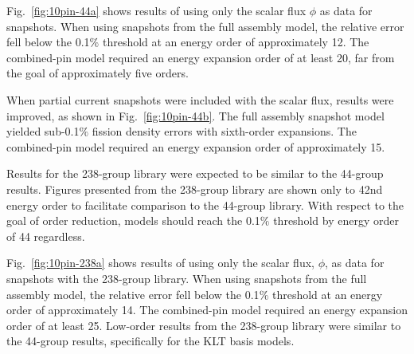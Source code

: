\documentclass[5p,times,twocolumn,10pt]{elsarticle}
\begin{document}
    Fig.~\ref{fig:10pin-44a} shows results of using only the scalar flux $\phi$
    as data for snapshots.  When using snapshots from the full assembly model,
    the relative error fell below the 0.1$\%$ threshold at an energy order of
    approximately 12.  The combined-pin model required an energy expansion
order
    of at least 20, far from the goal of approximately five orders.

    When partial current snapshots were included with the scalar flux, results
    were
    improved, as shown in Fig.~\ref{fig:10pin-44b}. The full assembly snapshot
    model yielded sub-0.1$\%$ fission density errors with sixth-order
    expansions.  The combined-pin model required an energy expansion order of
    approximately 15.

    Results for the 238-group library were expected to be similar to the
    44-group results.  Figures presented from the 238-group library
    are shown only to 42nd energy order to facilitate comparison to the
44-group
    library.  With respect to the goal of order reduction, models should
    reach the 0.1$\%$ threshold by energy order of 44 regardless.

    Fig.~\ref{fig:10pin-238a} shows results of using only the scalar flux,
    $\phi$, as data for snapshots with the 238-group library.  When using
snapshots
    from the full assembly model, the relative error fell below the 0.1$\%$
    threshold at an energy order of approximately 14.
    The combined-pin model required an energy expansion order of at least 25.
    Low-order results from the 238-group library were similar to the 44-group
    results, specifically for the KLT basis models.
\end{document}
